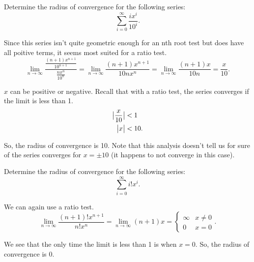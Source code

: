 \begin{example}
	Determine the radius of convergence for the following series:
	\begin{equation*}
		\sum_{i=0}^{\infty}{\frac{ix^i}{10^i}}.
	\end{equation*}
\end{example}
\begin{answer}
	Since this series isn't quite geometric enough for an nth root test but does have all poitive terms, it seems most suited for a ratio test.
	\begin{equation*}
		\lim_{n\to\infty}{\frac{\frac{(n+1)x^{n+1}}{10^{n+1}}}{\frac{nx^n}{10^n}}} = \lim_{n\to\infty}{\frac{(n+1)x^{n+1}}{10nx^n}} = \lim_{n\to\infty}{\frac{(n+1)x}{10n}} = \frac{x}{10}.
	\end{equation*}
	
	$x$ can be positive or negative.
	Recall that with a ratio test, the series converges if the limit is less than 1.
	\begin{align*}
		\big\lvert \frac{x}{10} \big\rvert &< 1 \\
		\big\lvert x \big\rvert &< 10.
	\end{align*}
	
	So, the radius of convergence is 10.
	Note that this analysis doesn't tell us for sure of the series converges for $x=\pm 10$ (it happens to not converge in this case).
\end{answer}

\begin{example}
	Determine the radius of convergence for the following series:
	\begin{equation*}
		\sum_{i=0}^{\infty}{i!x^i}.
	\end{equation*}
\end{example}
\begin{answer}
	We can again use a ratio test.
	\begin{equation*}
		\lim_{n\to\infty}{\frac{(n+1)!x^{n+1}}{n!x^n}} = \lim_{n\to\infty}{(n+1)x} = \begin{cases} \infty & x\neq 0 \\ 0 & x = 0 \end{cases}.
	\end{equation*}
	
	We see that the only time the limit is less than 1 is when $x=0$.
	So, the radius of convergence is 0.
\end{answer}

